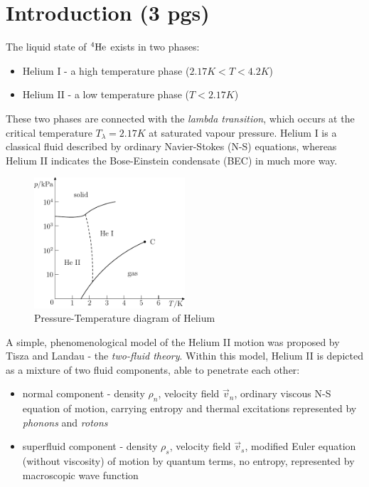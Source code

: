 \chapter*{Introduction (3 pgs)}

	The liquid state of ${}^4\mathrm{He}$ exists in two phases:
	\begin{itemize}
		\item Helium I - a high temperature phase ($2.17\unit{K}<T<4.2\unit{K}$)
		\item Helium II - a low temperature phase ($T<2.17\unit{K}$)
	\end{itemize}

	These two phases are connected with the \textit{lambda transition}, which occurs at the critical temperature $T_{\lambda} = 2.17 \unit{K}$ at saturated vapour pressure. Helium I is a classical fluid described by ordinary Navier-Stokes (N-S) equations, whereas Helium II indicates the Bose-Einstein condensate (BEC) in much more way.

	\begin{figure}[h]
		\centering
		\includegraphics[width=0.5\textwidth]{graphics/theory/phase_diag}
		\caption{Pressure-Temperature diagram of Helium}
		\label{phase}
	\end{figure}

	A simple, phenomenological model of the Helium II motion was proposed by Tisza and Landau - the \textit{two-fluid theory}. Within this model, Helium II is depicted as a mixture of two fluid components, able to penetrate each other:

	\begin{itemize}
		\item normal component - density $\rho_n$, velocity field $\vec{v}_n$, ordinary viscous N-S equation of motion, carrying entropy and thermal excitations represented by \textit{phonons} and \textit{rotons}
		\item superfluid component - density $\rho_s$, velocity field $\vec{v}_s$, modified Euler equation (without viscosity) of motion by quantum terms, no entropy, represented by macroscopic wave function
	\end{itemize}

